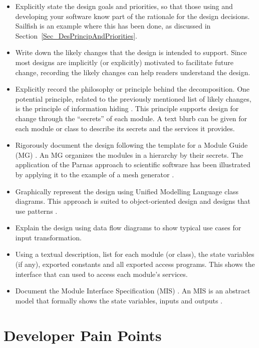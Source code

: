 \documentclass[final, 3p, times, authoryear]{elsarticle}
\begin{document}
\begin{itemize}
	\item Explicitly state the design goals and priorities, so that those using
	and developing your software know part of the rationale for the design
	decisions. Sailfish is an example where this has been done, as discussed in
	Section~\ref{Sec_DesPrincipAndPriorities}.
	\item Write down the likely changes that the design is intended to support.
	Since most designs are implicitly (or explicitly) motivated to facilitate
	future change, recording the likely changes can help readers understand the
	design.
	\item Explicitly record the philosophy or principle behind the
	decomposition. One potential principle, related to the previously mentioned
	list of likely changes, is the principle of information hiding
	\citep{Parnas1972a}.  This principle supports design for change through the
	``secrets'' of each module. A text blurb can be given for each module or
	class to describe its secrets and the services it provides.
	\item Rigorously document the design following the template for a Module
	Guide (MG) \citep{ParnasEtAl1984}.  An MG organizes the modules in a
	hierarchy by their secrets. The application of the Parnas approach to
	scientific software has been illustrated by applying it to the example of a
	mesh generator \citep{SmithAndYu2009}.
	\item Graphically represent the design using Unified Modelling Language
	class diagrams.  This approach is suited to object-oriented design and
	designs that use patterns \citep{Gamma1995}.
	\item Explain the design using data flow diagrams to show typical use cases
	for input transformation.
	\item Using a textual description, list for each module (or class), the
	state variables (if any), exported constants and all exported access
	programs.  This shows the interface that can used to access each module's
	services.
	\item Document the Module Interface Specification (MIS)
	\citep{HoffmanAndStrooper1995}. An MIS is an abstract model that 
	formally shows the state variables, inputs and outputs
	\citep{ElSheikhEtAl2004, SmithAndYu2009}.
\end{itemize}

\section{Developer Pain Points} \label{painpoints}
\end{document}
